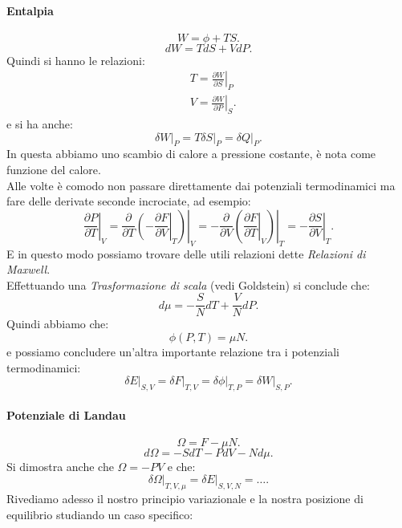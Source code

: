 \paragraph{Entalpia}%
\[
	W = \phi + TS
.\] 
\[
	dW = TdS + VdP
.\] 
Quindi si hanno le relazioni:
\begin{align}
	&T = \left.\frac{\partial W}{\partial S}\right|_{P}\\
	&V = \left.\frac{\partial W}{\partial P} \right|_{S}
.\end{align}
e si ha anche:
\[
	 \left.\delta W\right|_{P} = T \left.\delta S\right|_{P}= \left.\delta Q\right|_{P}
.\] 
In questa abbiamo uno scambio di calore a pressione costante, è nota come funzione del calore.\\
Alle volte è comodo non passare direttamente dai potenziali termodinamici ma fare delle derivate seconde incrociate, ad esempio:
\[
	\left.\frac{\partial P}{\partial T} \right|_{V}=
	\left.\frac{\partial }{\partial T} \left.\left( -\frac{\partial F}{\partial V}\right|_{T}  \right) \right|_{V}
	= -\left.\frac{\partial }{\partial V}\left(  \left.\frac{\partial F}{\partial T} \right|_{V}  \right) \right|_{T} =
	-\left.\frac{\partial S}{\partial V} \right|_{T} 
.\] 
E in questo modo possiamo trovare delle utili relazioni dette \textit{Relazioni di Maxwell}.\\
Effettuando una \textit{Trasformazione di scala} (vedi Goldstein) si conclude che:
\[
	d\mu = - \frac{S}{N}dT + \frac{V}{N}dP 
.\]
Quindi abbiamo che:
\[
	\phi\left( P,T \right) = \mu N
.\] 
e possiamo concludere un'altra importante relazione tra i potenziali termodinamici:
\[
	\left.\delta E\right|_{S,V} = \left.\delta F\right|_{T,V} = \left.\delta \phi\right|_{T,P} = \left.\delta W\right|_{S, P}
.\] 
\paragraph{Potenziale di Landau}%
\[
	\Omega = F - \mu N
.\] 
\[
	d\Omega = -SdT - PdV - Nd\mu
.\] 
Si dimostra anche che $\Omega = -PV$ e che:
\[
	\left.\delta \Omega\right|_{T,V,\mu} = \left.\delta E\right|_{S, V, N}= \ldots
.\] 
Rivediamo adesso il nostro principio variazionale e la nostra posizione di equilibrio studiando un caso specifico:
